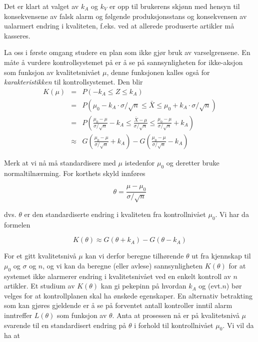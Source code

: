 Det er klart at valget av $k_A$ og $k_V$ er opp til brukerens skjønn
med hensyn til konsekvensene av falsk alarm og følgende produksjonsstans
og konsekvensen av ualarmert endring i kvaliteten, f.eks. ved at 
allerede produserte artikler må kasseres.


La oss i første omgang studere en plan som ikke gjør bruk av 
varselgrensene.  En måte å vurdere kontrollsystemet på er
å se på sannsynligheten for ikke-aksjon som funksjon av
kvalitetsnivået $\mu$, denne funksjonen kalles også for
{\em karakteristikken} til kontrollsystemet. Den blir
\begin{eqnarray*}
K(\mu )&=&P(-k_A\leq Z\leq k_A) \\
       &=&P({\mu}_0 - k_A \cdot \sigma /\sqrt{n} \leq \bar{X}
                             \leq {\mu}_0 + k_A \cdot \sigma /\sqrt{n})  \\
       &=&P(\frac{{\mu}_0 - \mu}{\sigma /\sqrt{n}}-k_A \leq
           \frac{\bar{X} - \mu}{\sigma /\sqrt{n}} \leq
           \frac{{\mu}_0 - \mu}{\sigma /\sqrt{n}}+k_A)\\
 &\approx&G(\frac{{\mu}_0 - \mu}{\sigma /\sqrt{n}}+k_A)-
          G(\frac{{\mu}_0 - \mu}{\sigma /\sqrt{n}}-k_A)
\end{eqnarray*}

\noindent Merk at vi nå må standardisere med $\mu$ istedenfor ${\mu}_0$ og
deretter bruke normaltilnærming.  For korthets skyld innføres

\[  \theta =\frac{\mu - {\mu}_0}{\sigma /\sqrt{n}} \]

\noindent dvs. $\theta$ er den standardiserte endring i kvaliteten fra 
kontrollnivået ${\mu}_0$.  Vi har da formelen

\[ K(\theta ) \approx G(\theta +k_A)-G(\theta -k_A)  \]


\noindent For et gitt kvalitetsnivå $\mu$ kan vi derfor beregne tilhørende
$\theta$ ut fra kjennskap til ${\mu}_0$ og $\sigma$ og $n$, og vi kan
da beregne (eller avlese) sannsynligheten $K(\theta)$ for at systemet ikke 
alarmerer endring i kvalitetsnivået ved en enkelt kontroll av $n$
artikler.  Et studium av $K(\theta)$ kan gi pekepinn på hvordan 
$k_A$ og (evt.$n$) bør velges for at kontrollplanen skal ha ønskede
egenskaper.
En alternativ betrakting som kan gjøres gjeldende er å se på
forventet antall kontroller inntil alarm inntreffer $L(\theta)$ som 
funksjon av $\theta$.  Anta at prosessen nå er på kvalitetsnivå
$\mu$ svarende til en standardisert endring på $\theta$ i forhold
til kontrollnivået ${\mu}_0$. Vi vil da ha at

